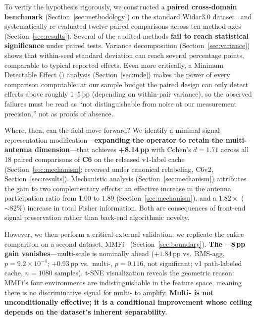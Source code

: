 \documentclass[11pt]{article}
\theoremstyle{definition}
\newcommand{\BVP}{\text{BVP}}
\newcommand{\MDE}{\text{MDE}}
\newcommand{\Rx}{\text{Rx}}
\begin{document}
To verify the hypothesis rigorously, we constructed a \textbf{paired cross-domain benchmark} (Section~\ref{sec:methodology}) on the standard Widar3.0 dataset~\cite{zheng2019widar} and systematically re-evaluated twelve paired comparisons across ten method axes (Section~\ref{sec:results}). Several of the audited methods \textbf{fail to reach statistical significance} under paired tests. Variance decomposition (Section~\ref{sec:variance}) shows that within-seed standard deviation can reach several percentage points, comparable to typical reported effects. Even more critically, a Minimum Detectable Effect (\MDE) analysis (Section~\ref{sec:mde}) makes the power of every comparison computable: at our sample budget the paired design can only detect effects above roughly 1--5\,pp (depending on within-pair variance), so the observed failures must be read as ``not distinguishable from noise at our measurement precision,'' not as proofs of absence.

Where, then, can the field move forward? We identify a minimal signal-representation modification---\textbf{expanding the \BVP{} operator to retain the multi-\Rx{} antenna dimension}---that achieves \textbf{+8.14\,pp} with Cohen's $d = 1.71$ across all 18 paired comparisons of \textbf{C6} on the released v1-label cache (Section~\ref{sec:mechanism}; reversed under canonical relabeling, C6v2, Section~\ref{sec:results}). Mechanistic analysis (Section~\ref{sec:mechanism}) attributes the gain to two complementary effects: an effective increase in the antenna participation ratio from $1.00$ to $1.89$ (Section~\ref{sec:mechanism}), and a $1.82\times$ (${\sim}82\%$) increase in total Fisher information. Both are consequences of front-end signal preservation rather than back-end algorithmic novelty.

However, we then perform a critical external validation: we replicate the entire comparison on a second dataset, MMFi~\cite{yang2023mmfi} (Section~\ref{sec:boundary}). \textbf{The +8\,pp gain vanishes}---multi-scale is nominally ahead ($+1.84$\,pp vs.\ RMS-agg, $p = 9.2\times10^{-4}$; $+0.93$\,pp vs.\ multi-\Rx, $p = 0.116$, not significant; v1 path-labeled cache, $n = 1080$ samples). t-SNE visualization reveals the geometric reason: MMFi's four environments are indistinguishable in the \BVP{} feature space, meaning there is no discriminative signal for multi-\Rx{} to amplify. \textbf{Multi-\Rx{} is not unconditionally effective; it is a conditional improvement whose ceiling depends on the dataset's inherent separability.}
\end{document}
